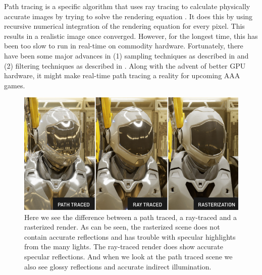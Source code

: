 Path tracing is a specific algorithm that uses ray tracing to calculate physically accurate images by trying to solve the rendering equation \cite{kajiya1986rendering}. It does this by using recursive numerical integration of the rendering equation for every pixel. This results in a realistic image once converged. However, for the longest time, this has been too slow to run in real-time on commodity hardware. Fortunately, there have been some major advances in (1) sampling techniques as described in \cite{lin2022generalized} and (2) filtering techniques as described in \cite{yang2020survey}. Along with the advent of better GPU hardware, it might make real-time path tracing a reality for upcoming AAA games.

\begin{figure}
    \centering
    \includegraphics[width=\linewidth]{figures/nvidia_ray_path_rasterization.png}
    \caption{Here we see the difference between a path traced, a ray-traced and a rasterized render. As can be seen, the rasterized scene does not contain accurate reflections and has trouble with specular highlights from the many lights. The ray-traced render does show accurate specular reflections. And when we look at the path traced scene we also see glossy reflections and accurate indirect illumination. \cite{NVIDIAPathRayRaster}}
    \label{fig:path_ray_raster}
\end{figure}


